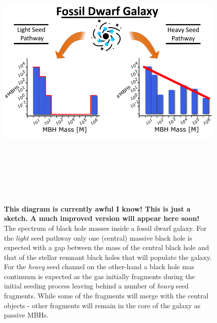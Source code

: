 \documentclass[twocolumn, tighten]{aastex631}
\begin{document}
\begin{figure}
\centering
\begin{minipage}{175mm}      \begin{center}
\centerline{
    \includegraphics[width=18.0cm, height=14cm]{Figure1.3.png}}
\caption{\textbf{This diagram is currently awful I know! This is just a sketch. A much improved version will appear here soon!} The spectrum of black hole masses inside a fossil dwarf galaxy. For the \textit{light} seed pathway only one (central) massive black hole is expected with a 
gap between the mass of the central black hole and that of the stellar remnant black holes that will populate the galaxy. For the \textit{heavy} seed channel on the other-hand a 
black hole mas continuum is expected as the gas initially fragments during the initial seeding process leaving behind a number of \textit{heavy} seed fragments. While some of the 
fragments will merge with the central objects - other fragments will remain in the core of the galaxy as passive MBHs.}
\label{Fig:Cartoon}
\end{center} \end{minipage}
\end{figure}
\end{document}
